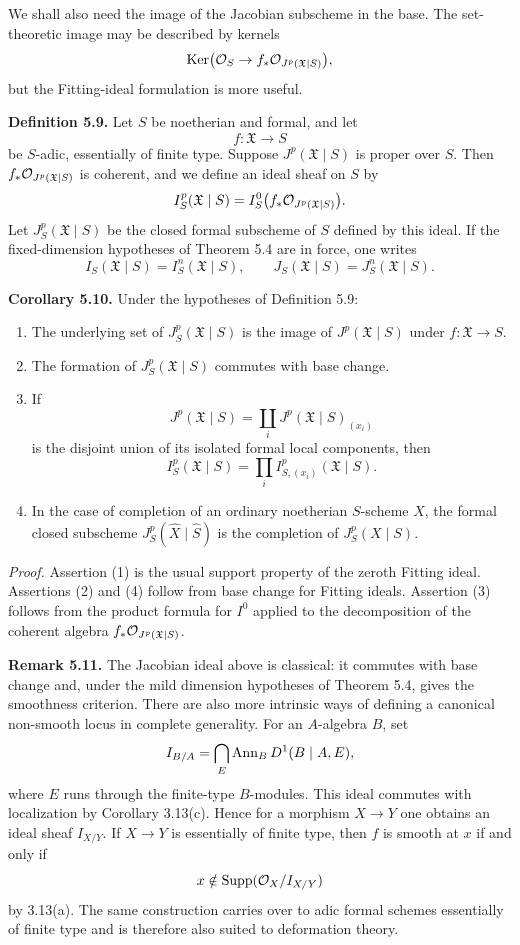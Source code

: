 \documentclass[11pt]{article}
\providecommand{\Ker}{\operatorname{Ker}}
\begin{document}
We shall also need the image of the Jacobian subscheme in the base.  The set-theoretic image may be described by kernels
\[
        \Ker\bigl(\Oo_S\to f_*\Oo_{J^p(\mathfrak X\mid S)}\bigr),
\]
but the Fitting-ideal formulation is more useful.

\textbf{Definition 5.9.}  Let \(S\) be noetherian and formal, and let
\[
        f:\mathfrak X\longrightarrow S
\]
be \(S\)-adic, essentially of finite type.  Suppose \(J^p(\mathfrak X\mid S)\) is proper over \(S\).  Then \(f_*\mathcal O_{J^p(\mathfrak X\mid S)}\) is coherent, and we define an ideal sheaf on \(S\) by
\[
        I^p_S(\mathfrak X\mid S)
        =
        I^0_S\bigl(f_*\mathcal O_{J^p(\mathfrak X\mid S)}\bigr).
\]
Let \(J^p_S(\mathfrak X\mid S)\) be the closed formal subscheme of \(S\) defined by this ideal.  If the fixed-dimension hypotheses of Theorem 5.4 are in force, one writes
\[
        I_S(\mathfrak X\mid S)=I^n_S(\mathfrak X\mid S),
        \qquad
        J_S(\mathfrak X\mid S)=J^n_S(\mathfrak X\mid S).
\]

\textbf{Corollary 5.10.}  Under the hypotheses of Definition 5.9:
\begin{enumerate}[label=(\arabic*)]
\item The underlying set of \(J^p_S(\mathfrak X\mid S)\) is the image of \(J^p(\mathfrak X\mid S)\) under \(f:\mathfrak X\to S\).
\item The formation of \(J^p_S(\mathfrak X\mid S)\) commutes with base change.
\item If
\[
        J^p(\mathfrak X\mid S)=\coprod_i J^p(\mathfrak X\mid S)_{(x_i)}
\]
is the disjoint union of its isolated formal local components, then
\[
        I^p_S(\mathfrak X\mid S)
        =
        \prod_i I^p_{S,(x_i)}(\mathfrak X\mid S).
\]
\item In the case of completion of an ordinary noetherian \(S\)-scheme \(X\), the formal closed subscheme \(J^p_S(\widehat X\mid \widehat S)\) is the completion of \(J^p_S(X\mid S)\).
\end{enumerate}

\emph{Proof.}  Assertion (1) is the usual support property of the zeroth Fitting ideal.  Assertions (2) and (4) follow from base change for Fitting ideals.  Assertion (3) follows from the product formula for \(I^0\) applied to the decomposition of the coherent algebra \(f_*\mathcal O_{J^p(\mathfrak X\mid S)}\).

\textbf{Remark 5.11.}  The Jacobian ideal above is classical: it commutes with base change and, under the mild dimension hypotheses of Theorem 5.4, gives the smoothness criterion.  There are also more intrinsic ways of defining a canonical non-smooth locus in complete generality.  For an \(A\)-algebra \(B\), set
\[
        I_{B/A}
        =
        \bigcap_E
        \operatorname{Ann}_B D^1(B\mid A,E),
\]
where \(E\) runs through the finite-type \(B\)-modules.  This ideal commutes with localization by Corollary 3.13(c).  Hence for a morphism \(X\to Y\) one obtains an ideal sheaf \(I_{X/Y}\).  If \(X\to Y\) is essentially of finite type, then \(f\) is smooth at \(x\) if and only if
\[
        x\notin \operatorname{Supp}(\mathcal O_X/I_{X/Y})
\]
by 3.13(a).  The same construction carries over to adic formal schemes essentially of finite type and is therefore also suited to deformation theory.
\end{document}
